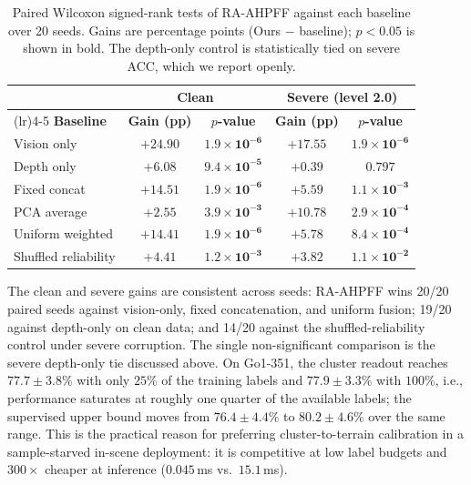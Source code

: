 \documentclass[11pt, a4paper]{article}
\begin{document}
\begin{table}[htbp]
    \centering
    \caption{Paired Wilcoxon signed-rank tests of RA-AHPFF against each baseline over 20 seeds. Gains are percentage points (Ours $-$ baseline); $p<0.05$ is shown in bold. The depth-only control is statistically tied on severe ACC, which we report openly.}
    \label{tab:wilcoxon}
    \footnotesize
    \setlength{\tabcolsep}{4.0pt}
    \begin{tabularx}{\textwidth}{>{\raggedright\arraybackslash}X cccc}
        \toprule
        & \multicolumn{2}{c}{\textbf{Clean}} & \multicolumn{2}{c}{\textbf{Severe (level 2.0)}} \\
        \cmidrule(lr){2-3}\cmidrule(lr){4-5}
        \textbf{Baseline} & \textbf{Gain (pp)} & \textbf{$p$-value} & \textbf{Gain (pp)} & \textbf{$p$-value} \\
        \midrule
        Vision only & $+24.90$ & $\mathbf{1.9\times10^{-6}}$ & $+17.55$ & $\mathbf{1.9\times10^{-6}}$ \\
        Depth only & $+6.08$ & $\mathbf{9.4\times10^{-5}}$ & $+0.39$ & $0.797$ \\
        Fixed concat & $+14.51$ & $\mathbf{1.9\times10^{-6}}$ & $+5.59$ & $\mathbf{1.1\times10^{-3}}$ \\
        PCA average & $+2.55$ & $\mathbf{3.9\times10^{-3}}$ & $+10.78$ & $\mathbf{2.9\times10^{-4}}$ \\
        Uniform weighted & $+14.41$ & $\mathbf{1.9\times10^{-6}}$ & $+5.78$ & $\mathbf{8.4\times10^{-4}}$ \\
        Shuffled reliability & $+4.41$ & $\mathbf{1.2\times10^{-3}}$ & $+3.82$ & $\mathbf{1.1\times10^{-2}}$ \\
        \bottomrule
    \end{tabularx}
\end{table}

The clean and severe gains are consistent across seeds: RA-AHPFF wins 20/20 paired seeds against vision-only, fixed concatenation, and uniform fusion; 19/20 against depth-only on clean data; and 14/20 against the shuffled-reliability control under severe corruption. The single non-significant comparison is the severe depth-only tie discussed above. On Go1-351, the cluster readout reaches $77.7\pm3.8\%$ with only $25\%$ of the training labels and $77.9\pm3.3\%$ with $100\%$, i.e., performance saturates at roughly one quarter of the available labels; the supervised upper bound moves from $76.4\pm4.4\%$ to $80.2\pm4.6\%$ over the same range. This is the practical reason for preferring cluster-to-terrain calibration in a sample-starved in-scene deployment: it is competitive at low label budgets and $300\times$ cheaper at inference ($0.045$\,ms vs.\ $15.1$\,ms).
\end{document}

